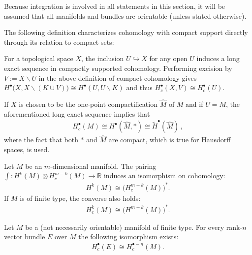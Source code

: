     Because integration is involved in all statements in this section, it will be assumed that all manifolds and bundles are orientable (unless stated otherwise).

    The following definition characterizes cohomology with compact support directly through its relation to compact sets:
    \begin{property}\label{bundle:reduced_compact_cohomology}
        For a topological space $X$, the inclusion $U\hookrightarrow X$ for any open $U$ induces a long exact sequence in compactly supported cohomology. Performing excision by $V:=X\backslash U$ in the above definition of compact cohomology gives $H^\bullet\big(X,X\backslash (K\cup V)\big)\cong H^\bullet(U,U\backslash K)$ and thus $H^\bullet_c(X,V)\cong H^\bullet_c(U)$.

        If $X$ is chosen to be the one-point compactification $\widehat{M}$ of $M$ and if $U=M$, the aforementioned long exact sequence implies that
        \begin{gather}
            H^\bullet_c(M)\cong H^\bullet(\widehat{M}, \ast)\cong\widetilde{H}^\bullet(\widehat{M})\,,
        \end{gather}
        where the fact that both $\ast$ and $\widehat{M}$ are compact, which is true for Hausdorff spaces, is used.
    \end{property}

    \begin{theorem}\label{bundle:poincare_duality}
        Let $M$ be an $m$-dimensional manifold. The pairing $\int:H^k(M)\otimes H^{m-k}_c(M)\rightarrow\mathbb{R}$ induces an isomorphism on cohomology:
        \begin{gather}
            H^k(M)\cong\Big(H^{m-k}_c(M)\Big)^*.
        \end{gather}
        If $M$ is of finite type, the converse also holds:
        \begin{gather}
            H^k_c(M)\cong\Big(H^{m-k}(M)\Big)^*.
        \end{gather}
    \end{theorem}
    \begin{result}
        Let $M$ be a (not necessarily orientable) manifold of finite type. For every rank-$n$ vector bundle $E$ over $M$ the following isomorphism exists:
        \begin{gather}
            H^\bullet_c(E)\cong H^{\bullet-n}_c(M).
        \end{gather}
    \end{result}

